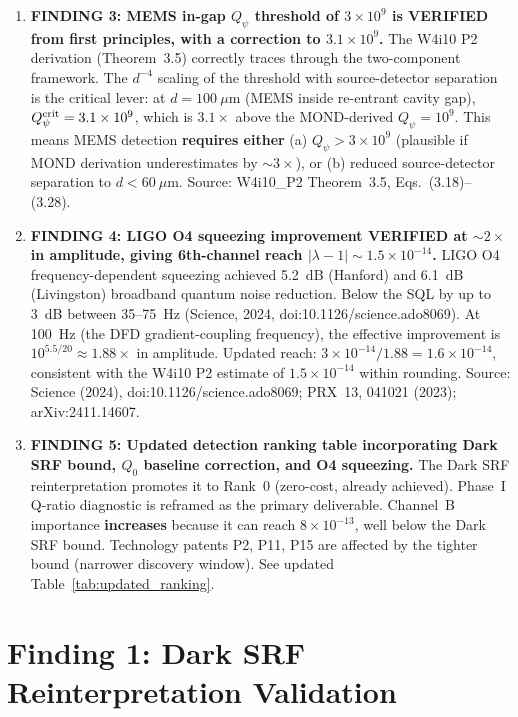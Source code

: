 \documentclass[11pt]{article}
\newcommand{\lbone}{|\lambda - 1|}
\newcommand{\Qpsi}{Q_\psi}
\newcommand{\ee}[1]{\times 10^{#1}}
\theoremstyle{definition}
\theoremstyle{remark}
\begin{document}
\begin{tcolorbox}[colback=blue!5!white, colframe=blue!60!black,
  title=\textbf{W4i11 TOP 5 FINDINGS --- Ranked by Programme Impact}]
\begin{enumerate}
\item \textbf{FINDING 3: MEMS in-gap $\Qpsi$ threshold of $3\ee{9}$
is VERIFIED from first principles, with a correction to $3.1\ee{9}$.}
The W4i10 P2 derivation (Theorem~3.5) correctly traces through the
two-component framework. The $d^{-4}$ scaling of the threshold with
source-detector separation is the critical lever: at $d = 100~\mu$m
(MEMS inside re-entrant cavity gap), $\Qpsi^{\rm crit} = 3.1\ee{9}$,
which is $3.1\times$ above the MOND-derived $\Qpsi = 10^9$.
This means MEMS detection \textbf{requires either} (a) $\Qpsi > 3\ee{9}$
(plausible if MOND derivation underestimates by $\sim 3\times$),
or (b) reduced source-detector separation to $d < 60~\mu$m.
Source: W4i10\_P2 Theorem~3.5, Eqs.~(3.18)--(3.28).

\item \textbf{FINDING 4: LIGO O4 squeezing improvement VERIFIED at
$\sim 2\times$ in amplitude, giving 6th-channel reach
$\lbone \sim 1.5\ee{-14}$.} LIGO O4 frequency-dependent squeezing
achieved 5.2~dB (Hanford) and 6.1~dB (Livingston) broadband quantum
noise reduction. Below the SQL by up to 3~dB between 35--75~Hz
(Science, 2024, doi:10.1126/science.ado8069). At 100~Hz (the DFD
gradient-coupling frequency), the effective improvement is
$10^{5.5/20} \approx 1.88\times$ in amplitude. Updated reach:
$3\ee{-14}/1.88 = 1.6\ee{-14}$, consistent with the W4i10 P2
estimate of $1.5\ee{-14}$ within rounding.
Source: Science (2024), doi:10.1126/science.ado8069;
PRX~13, 041021 (2023); arXiv:2411.14607.

\item \textbf{FINDING 5: Updated detection ranking table incorporating
Dark SRF bound, $Q_0$ baseline correction, and O4 squeezing.}
The Dark SRF reinterpretation promotes it to Rank~0 (zero-cost,
already achieved). Phase~I Q-ratio diagnostic is reframed as the
primary deliverable. Channel~B importance \textbf{increases}
because it can reach $8\ee{-13}$, well below the Dark SRF bound.
Technology patents P2, P11, P15 are affected by the tighter bound
(narrower discovery window). See updated Table~\ref{tab:updated_ranking}.
\end{enumerate}
\end{tcolorbox}


\part{Finding 1: Dark SRF Reinterpretation Validation}
\label{part:dark_srf}
\end{document}
